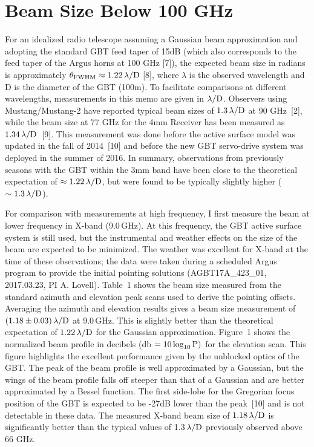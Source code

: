 \documentclass[12pt]{article}
\begin{document}
\section{Beam Size Below 100 GHz}

For an idealized radio telescope assuming a Gaussian beam
approximation and adopting the standard GBT feed taper of 15dB (which
also corresponds to the feed taper of the Argus horns at 100 GHz [7]),
the expected beam size in radians is approximately $\theta_{\rm FWHM}
\approx 1.22\,\lambda/{\rm D}$ [8], where $\lambda$ is the observed
wavelength and D is the diameter of the GBT (100m).  To facilitate
comparisons at different wavelengths, measurements in this memo are
given in $\lambda/{\rm D}$.  Observers using Mustang/Mustang-2 have
reported typical beam sizes of $1.3\,\lambda/{\rm D}$ at 90 GHz~[2],
while the beam size at 77 GHz for the 4mm Receiver has been measured
as $1.34\,\lambda/{\rm D}$~[9].  This measurement was done before the
active surface model was updated in the fall of 2014~[10] and before
the new GBT servo-drive system was deployed in the summer of 2016.  In
summary, observations from previously seasons with the GBT within the
3mm band have been close to the theoretical expectation of $\approx
1.22\,\lambda/{\rm D}$, but were found to be typically slightly higher
($\sim 1.3\,\lambda/{\rm D}$).

For comparison with measurements at high frequency, I first measure
the beam at lower frequency in X-band (9.0\,GHz).  At this frequency,
the GBT active surface system is still used, but the instrumental and
weather effects on the size of the beam are expected to be minimized.
The weather was excellent for X-band at the time of these
observations; the data were taken during a scheduled Argus program to
provide the initial pointing solutions (AGBT17A\_423\_01, 2017.03.23,
PI A. Lovell).  Table~1 shows the beam size measured from the standard
azimuth and elevation peak scans used to derive the pointing offsets.
Averaging the azimuth and elevation results gives a beam size
measurement of $(1.18\pm0.03)\,\lambda/{\rm D}$ at 9.0\,GHz.  This is
slightly better than the theoretical expectation of
$1.22\,\lambda/{\rm D}$ for the Gaussian approximation.  Figure~1
shows the normalized beam profile in decibels (db $=10\log_{10}{\rm P})$ for the elevation scan.  This figure highlights
the excellent performance given by the unblocked optics of the GBT.
The peak of the beam profile is well approximated by a Gaussian, but
the wings of the beam profile falls off steeper than that of a
Gaussian and are better approximated by a Bessel function.  The first
side-lobe for the Gregorian focus position of the GBT is expected to
be -27dB lower than the peak~[10] and is not detectable in these data.
The measured X-band beam size of $1.18\,\lambda/{\rm D}$ is
significantly better than the typical values of 1.3$\,\lambda/{\rm D}$
previously observed above 66 GHz.
\end{document}
